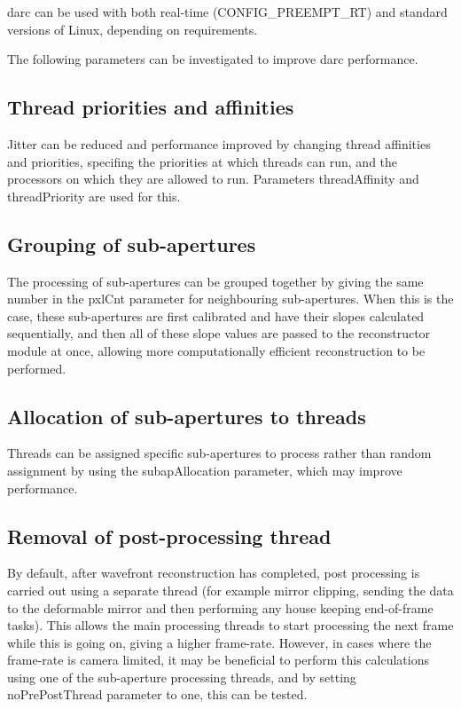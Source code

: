 \documentclass[a4,10pt]{article}
\begin{document}
darc can be used with both real-time (CONFIG\_PREEMPT\_RT) and
standard versions of Linux, depending on requirements.

The following parameters can be investigated to improve darc performance.

\subsection{Thread priorities and affinities}
Jitter can be reduced and performance improved by changing thread
affinities and priorities, specifing the priorities at which threads
can run, and the processors on which they are allowed to run.
Parameters threadAffinity and threadPriority are used for this.

\subsection{Grouping of sub-apertures}
The processing of sub-apertures can be grouped together by giving the
same number in the pxlCnt parameter for neighbouring sub-apertures.
When this is the case, these sub-apertures are first calibrated and
have their slopes calculated sequentially, and then all of these slope
values are passed to the reconstructor module at once, allowing more
computationally efficient reconstruction to be performed. 

\subsection{Allocation of sub-apertures to threads}
Threads can be assigned specific sub-apertures to process rather than
random assignment by using the subapAllocation parameter, which may
improve performance.

\subsection{Removal of post-processing thread}
By default, after wavefront reconstruction has completed, post
processing is carried out using a separate thread (for example mirror
clipping, sending the data to the deformable mirror and then
performing any house keeping end-of-frame tasks).  This allows the
main processing threads to start processing the next frame while this
is going on, giving a higher frame-rate.  However, in cases where the
frame-rate is camera limited, it may be beneficial to perform this
calculations using one of the sub-aperture processing threads, and by
setting noPrePostThread parameter to one, this can be tested.
\end{document}
